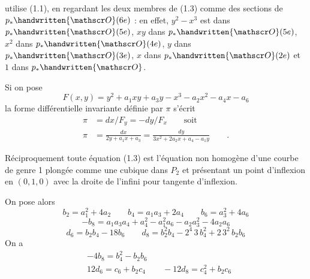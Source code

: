 utilise (1.1), en regardant les deux membres de (1.3) comme des sections de $p_*\handwritten{\mathscr O}(6e)$ : en effet, $y^2-x^3$ est dans $p_*\handwritten{\mathscr O}(5e)$, $xy$ dans $p_*\handwritten{\mathscr O}(5e)$, $x^2$ dans $p_*\handwritten{\mathscr O}(4e)$, $y$ dans $p_*\handwritten{\mathscr O}(3e)$, $x$ dans $p_*\handwritten{\mathscr O}(2e)$ et $1$ dans $p_*\handwritten{\mathscr O}$.

Si on pose
\[
F(x,y)=y^2+a_1xy+a_3y-x^3-a_2x^2-a_4x-a_6
\]
la forme différentielle invariante définie par $\pi$ s'écrit
\[
\begin{aligned}
\pi&=dx/F_y=-dy/F_x\qquad\text{soit}\\
\pi&=\frac{dx}{2y+a_1x+a_3}=\frac{dy}{3x^2+2a_2x+a_4-a_1y}\qquad .
\end{aligned}
\]

Réciproquement toute équation (1.3) est l'équation non homogène d'une courbe de genre 1 plongée comme une cubique dans $P_2$ et présentant un point d'inflexion en $(0,1,0)$ avec la droite de l'infini pour tangente d'inflexion.

On pose alors
\[
b_2=a_1^2+4a_2\qquad b_4=a_1a_3+2a_4\qquad b_6=a_3^2+4a_6\tag*{(1.4)}
\]
\[
-b_8=a_1a_3a_4+a_4^2-a_1^2a_6-a_2a_3^2-4a_2a_6
\]
\[
d_6=b_2b_4-18b_6\qquad d_8=b_2^2b_4-2^4\,3\,b_4^2+2\,3^2\,b_2b_6
\]
On a
\[
\begin{aligned}
&-4b_8=b_4^2-b_2b_6\\
&12d_6=c_6+b_2c_4\qquad -12d_8=c_4^2+b_2c_6
\end{aligned}
\]

